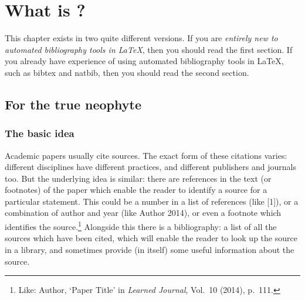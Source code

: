 \chapter{What is ?}

This chapter exists in two quite different versions. If you are \emph{entirely new to automated bibliography tools in \LaTeX}, then you should read the first section. If you already have experience of using automated bibliography tools in \LaTeX, such as bibtex and natbib, then you should read the second section.

\section{For the true neophyte}

\subsection{The basic idea}

Academic papers usually cite sources. The exact form of these citations varies: different disciplines have different practices, and different publishers and journals too. But the underlying idea is similar: there are references in the text (or footnotes) of the paper which enable the reader to identify a source for a particular statement. This could be a number in a list of references (like [1]), or a combination of author and year (like Author 2014), or even a footnote which identifies the source.\footnote{Like: Author, `Paper Title' in \emph{Learned Journal}, Vol.\ 10 (2014), p.\ 111.} Alongside this there is a bibliography: a list of all the sources which have been cited, which will enable the reader to look up the source in a library, and sometimes provide (in itself) some useful information about the source.

